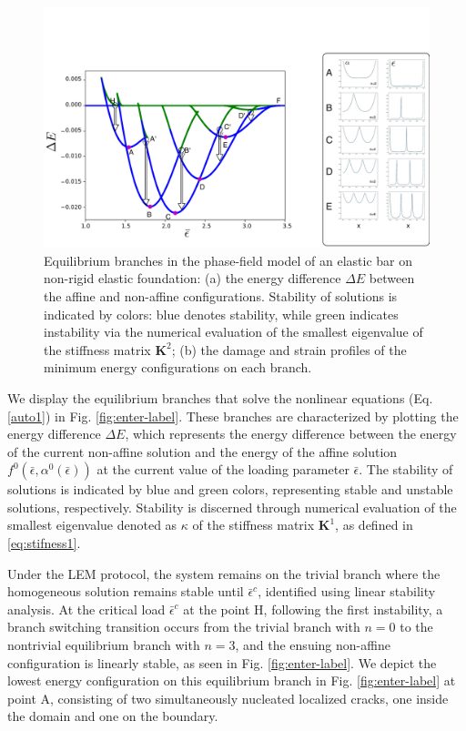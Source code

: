 \begin{figure}
\includegraphics[scale=0.1]{./final_images/fig3.pdf}
    \caption{
Equilibrium branches in the phase-field model of an elastic bar on non-rigid elastic foundation: (a) the energy difference $\Delta E$ between the affine and non-affine configurations. Stability of solutions is indicated by colors: blue denotes stability, while green indicates instability   via the numerical evaluation of the smallest eigenvalue of the stiffness matrix $\mathbf{K}^2$; (b) the damage and strain profiles of the minimum energy configurations on each branch.}
    \label{fig:enter-label2}
\end{figure}

We display the equilibrium branches that solve the nonlinear equations (Eq. \ref{auto1}) in Fig. \ref{fig:enter-label}. These branches are characterized by plotting the energy difference $\Delta E$, which represents the energy difference between the energy of the current non-affine solution and the energy of the affine solution $f^0(\bar{\epsilon}, \alpha^0(\bar{\epsilon}))$ at the current value of the loading parameter $\bar\epsilon$. The stability of solutions is indicated by blue and green colors, representing stable and unstable solutions, respectively. Stability is discerned through numerical evaluation of the smallest eigenvalue denoted as $\kappa$ of the stiffness matrix $\mathbf{K}^1$, as defined in \eqref{eq:stifness1}.

Under the LEM protocol, the system remains on the trivial branch where the homogeneous solution remains stable until $\bar\epsilon^c$, identified using linear stability analysis. At the critical load $\bar\epsilon^c$  at the point H, following the first instability, a branch switching transition occurs from the trivial branch with $n = 0$ to the nontrivial equilibrium branch with $n = 3$, and the ensuing non-affine configuration is linearly stable, as seen in Fig. \ref{fig:enter-label}. We depict the lowest energy configuration on this equilibrium branch in Fig. \ref{fig:enter-label} at point A, consisting of two simultaneously nucleated localized cracks, one inside the domain and one on the boundary. 

